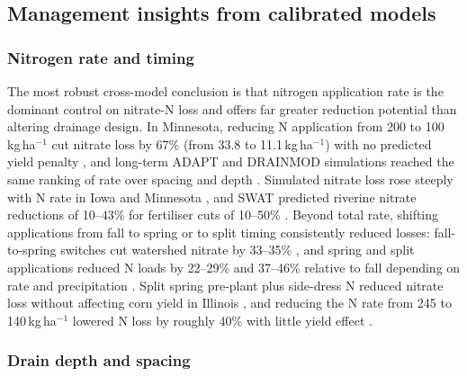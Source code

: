 \documentclass[11pt]{article}
\begin{document}
\subsection{Management insights from calibrated models}

\subsubsection{Nitrogen rate and timing}

The most robust cross-model conclusion is that nitrogen application rate is the dominant control on nitrate-N loss and offers far greater reduction potential than altering drainage design. In Minnesota, reducing N application from 200 to 100\,kg\,ha$^{-1}$ cut nitrate loss by 67\% (from 33.8 to 11.1\,kg\,ha$^{-1}$) with no predicted yield penalty \parencite{Moriasi2013}, and long-term ADAPT and DRAINMOD simulations reached the same ranking of rate over spacing and depth \parencite{Davis2000,Ale2013}. Simulated nitrate loss rose steeply with N rate in Iowa and Minnesota \parencite{Bakhsh2004,Zhao2000}, and SWAT predicted riverine nitrate reductions of 10--43\% for fertiliser cuts of 10--50\% \parencite{Hu2007}. Beyond total rate, shifting applications from fall to spring or to split timing consistently reduced losses: fall-to-spring switches cut watershed nitrate by 33--35\% \parencite{Gowda2007,Nangia2010}, and spring and split applications reduced N loads by 22--29\% and 37--46\% relative to fall depending on rate and precipitation \parencite{Wilson2020}. Split spring pre-plant plus side-dress N reduced nitrate loss without affecting corn yield in Illinois \parencite{Singh2020b,Singh2022c}, and reducing the N rate from 245 to 140\,kg\,ha$^{-1}$ lowered N loss by roughly 40\% with little yield effect \parencite{Fang2012}.

\subsubsection{Drain depth and spacing}
\end{document}
